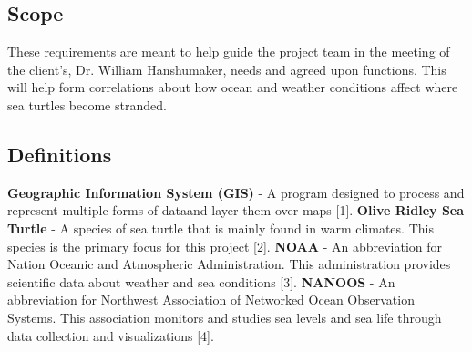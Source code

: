 \documentclass[onecolumn, draftclsnofoot,10pt, compsoc]{IEEEtran}
\begin{document}
\begin{singlespace}
\subsection{Scope}
    These requirements are meant to help guide the project team in the meeting of the client's, Dr. William Hanshumaker, needs and agreed upon functions.  This will help form correlations about how ocean and weather conditions affect where sea turtles become stranded.
\subsection{Definitions}
    \textbf{Geographic Information System (GIS)} - A program designed to process and represent multiple forms of dataand layer them over maps [1]. \newline \newline
    \textbf{Olive Ridley Sea Turtle} - A species of sea turtle that is mainly found in warm climates. This species is the primary focus for this project [2]. \newline \newline
    \textbf{NOAA} - An abbreviation for Nation Oceanic and Atmospheric Administration. This administration provides scientific data about weather and sea conditions [3]. \newline \newline
    \textbf{NANOOS} - An abbreviation for Northwest Association of Networked Ocean Observation Systems.  This association monitors and studies sea levels and sea life through data collection and visualizations [4].

\end{singlespace}
\end{document}
